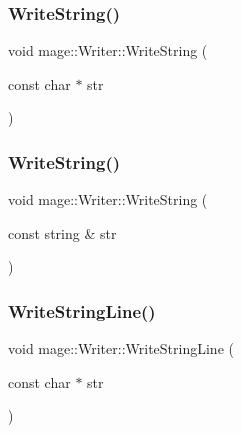 \hypertarget{classmage_1_1_writer_abffb25b71fc692db26abfa9dd147874e}{}\label{classmage_1_1_writer_abffb25b71fc692db26abfa9dd147874e} 
\subsubsection{\texorpdfstring{Write\+String()}{WriteString()}\hspace{0.1cm}{\footnotesize\ttfamily [1/2]}}
{\footnotesize\ttfamily void mage\+::\+Writer\+::\+Write\+String (\begin{DoxyParamCaption}\item[{const char $\ast$}]{str }\end{DoxyParamCaption})\hspace{0.3cm}{\ttfamily [protected]}}

\hypertarget{classmage_1_1_writer_aaa0e62c04e6ff6c90fa73c64fc48635d}{}\label{classmage_1_1_writer_aaa0e62c04e6ff6c90fa73c64fc48635d} 
\subsubsection{\texorpdfstring{Write\+String()}{WriteString()}\hspace{0.1cm}{\footnotesize\ttfamily [2/2]}}
{\footnotesize\ttfamily void mage\+::\+Writer\+::\+Write\+String (\begin{DoxyParamCaption}\item[{const string \&}]{str }\end{DoxyParamCaption})\hspace{0.3cm}{\ttfamily [protected]}}

\hypertarget{classmage_1_1_writer_ad53f69e0f722c4d4b8b320ea39770c1a}{}\label{classmage_1_1_writer_ad53f69e0f722c4d4b8b320ea39770c1a} 
\subsubsection{\texorpdfstring{Write\+String\+Line()}{WriteStringLine()}\hspace{0.1cm}{\footnotesize\ttfamily [1/2]}}
{\footnotesize\ttfamily void mage\+::\+Writer\+::\+Write\+String\+Line (\begin{DoxyParamCaption}\item[{const char $\ast$}]{str }\end{DoxyParamCaption})\hspace{0.3cm}{\ttfamily [protected]}}

